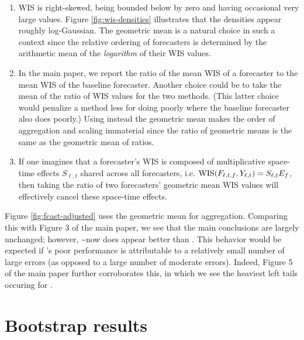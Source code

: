 \documentclass[9pt,twoside,lineno]{pnas-new}
\begin{document}
\begin{enumerate}
\item  WIS is right-skewed, being bounded below by zero and having
  occasional very large values.   Figure \ref{fig:wis-densities} illustrates that the
  densities appear roughly log-Gaussian.  The geometric mean is a
  natural choice in such a context since the relative ordering of forecasters is
  determined by the arithmetic mean of the {\em logarithm} of their WIS
  values.
\item In the main paper, we report the ratio of the mean WIS of a
  forecaster to the mean WIS of the baseline forecaster. Another
  choice could be to take the mean of the ratio of WIS values for the
  two methods. (This latter choice would penalize a method less for
  doing poorly where the baseline forecaster also does poorly.)
Using instead the geometric mean makes the order of aggregation and
scaling immaterial since the ratio of geometric means is the same as
the geometric mean of ratios.
\item If one imagines that a forecaster's WIS is composed of
  multiplicative space-time effects $S_{\ell,t}$ shared across all forecasters,
  i.e. $\mathrm{WIS}(F_{\ell,t,f},Y_{\ell,t})=S_{\ell,t}E_{f}$, then
  taking the ratio of two forecasters' geometric mean WIS values will
  effectively cancel these space-time effects.
\end{enumerate}

Figure \ref{fig:fcast-adjusted} uses the geometric mean for aggregation.
Comparing this with Figure 3 of the main paper, we see that the main
conclusions are largely unchanged; however, \chngcli\textasciitilde now
does appear better than \ar. This behavior would be expected if
\chngcli's poor performance is attributable to a relatively small number
of large errors (as opposed to a large number of moderate errors).
Indeed, Figure 5 of the main paper further corroborates this, in which
we see the heaviest left tails occuring for \chngcli.

\hypertarget{bootstrap-results}{%
\section{Bootstrap results}\label{bootstrap-results}}
\end{document}
